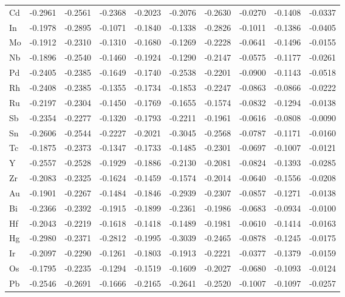 \documentclass[a4paper, 12pt]{article}
\begin{document}
\begin{table}[htbp]
{\begin{tabular}{l *{9}{l}}
      Cd & -0.2961 & -0.2561 & -0.2368 & -0.2023 & -0.2076 & -0.2630 & -0.0270 & -0.1408 & -0.0337 \\
      In & -0.1978 & -0.2895 & -0.1071 & -0.1840 & -0.1338 & -0.2826 & -0.1011 & -0.1386 & -0.0405 \\
      Mo & -0.1912 & -0.2310 & -0.1310 & -0.1680 & -0.1269 & -0.2228 & -0.0641 & -0.1496 & -0.0155 \\
      Nb & -0.1896 & -0.2540 & -0.1460 & -0.1924 & -0.1290 & -0.2147 & -0.0575 & -0.1177 & -0.0261 \\
      Pd & -0.2405 & -0.2385 & -0.1649 & -0.1740 & -0.2538 & -0.2201 & -0.0900 & -0.1143 & -0.0518 \\
      Rh & -0.2408 & -0.2385 & -0.1355 & -0.1734 & -0.1853 & -0.2247 & -0.0863 & -0.0866 & -0.0222 \\
      Ru & -0.2197 & -0.2304 & -0.1450 & -0.1769 & -0.1655 & -0.1574 & -0.0832 & -0.1294 & -0.0138 \\
      Sb & -0.2354 & -0.2277 & -0.1320 & -0.1793 & -0.2211 & -0.1961 & -0.0616 & -0.0808 & -0.0090 \\
      Sn & -0.2606 & -0.2544 & -0.2227 & -0.2021 & -0.3045 & -0.2568 & -0.0787 & -0.1171 & -0.0160 \\
      Tc & -0.1875 & -0.2373 & -0.1347 & -0.1733 & -0.1485 & -0.2301 & -0.0697 & -0.1007 & -0.0121 \\
      Y  & -0.2557 & -0.2528 & -0.1929 & -0.1886 & -0.2130 & -0.2081 & -0.0824 & -0.1393 & -0.0285 \\
      Zr & -0.2083 & -0.2325 & -0.1624 & -0.1459 & -0.1574 & -0.2014 & -0.0640 & -0.1556 & -0.0208 \\
      Au & -0.1901 & -0.2267 & -0.1484 & -0.1846 & -0.2939 & -0.2307 & -0.0857 & -0.1271 & -0.0138 \\
      Bi & -0.2366 & -0.2392 & -0.1915 & -0.1899 & -0.2361 & -0.1986 & -0.0683 & -0.0934 & -0.0100 \\
      Hf & -0.2043 & -0.2219 & -0.1618 & -0.1418 & -0.1489 & -0.1981 & -0.0610 & -0.1414 & -0.0163 \\
      Hg & -0.2980 & -0.2371 & -0.2812 & -0.1995 & -0.3039 & -0.2465 & -0.0878 & -0.1245 & -0.0175 \\
      Ir & -0.2097 & -0.2290 & -0.1261 & -0.1803 & -0.1913 & -0.2221 & -0.0377 & -0.1379 & -0.0159 \\
      Os & -0.1795 & -0.2235 & -0.1294 & -0.1519 & -0.1609 & -0.2027 & -0.0680 & -0.1093 & -0.0124 \\
      Pb & -0.2546 & -0.2691 & -0.1666 & -0.2165 & -0.2641 & -0.2520 & -0.1007 & -0.1097 & -0.0257 \\

\end{tabular}}
\end{table}
\end{document}
